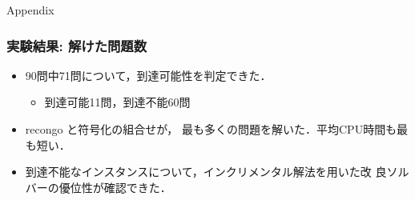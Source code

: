 \appendix
\backupbegin
\begin{frame}{}
  \begin{center}\Huge
    Appendix
  \end{center}
\end{frame}
\begin{frame}\frametitle{実験結果: 解けた問題数}

  \begin{exampleblock}{}
    \centering
    \renewcommand{\arraystretch}{1.2}
    \scalebox{0.9}{}
  \end{exampleblock}

  \begin{itemize}
  \item 90問中71問について，到達可能性を判定できた．
    \begin{itemize}
    \item 到達可能11問，到達不能60問
    \end{itemize}
  \item recongo と符号化の組合せが，
    最も多くの問題を解いた．平均CPU時間も最も短い．
  \item 到達不能なインスタンスについて，インクリメンタル解法を用いた改
    良ソルバーの優位性が確認できた．
  \end{itemize}
\end{frame}
